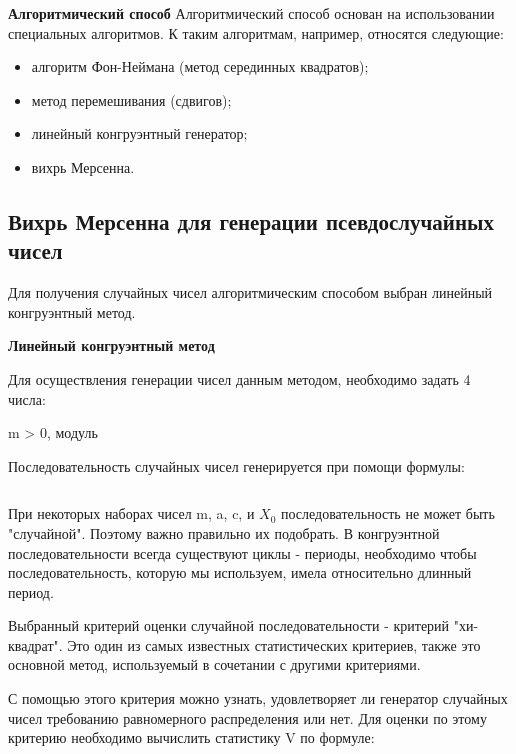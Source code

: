 \documentclass[14pt, a4paper]{extarticle}
\begin{document}
\textbf{Алгоритмический способ}
Алгоритмический способ основан на использовании специальных алгоритмов. К таким алгоритмам, например, относятся следующие:

\begin{itemize}
	\item алгоритм Фон-Неймана (метод серединных квадратов);
	\item метод перемешивания (сдвигов);
	\item линейный конгруэнтный генератор;
	\item вихрь Мерсенна.
\end{itemize}


\subsection{Вихрь Мерсенна для генерации псевдослучайных чисел}

\textbf{}

Для получения случайных чисел алгоритмическим способом выбран линейный конгруэнтный метод.

\textbf{Линейный конгруэнтный метод}

Для осуществления генерации чисел данным методом, необходимо задать 4 числа:


m > 0,  модуль





Последовательность случайных чисел генерируется при помощи формулы:

\begin{equation}
\end{equation}

При некоторых наборах чисел m, a, c, и $X_{0}$ последовательность не может быть "случайной". Поэтому важно правильно их подобрать. В конгруэнтной последовательности всегда существуют циклы - периоды, необходимо чтобы последовательность, которую мы используем, имела относительно длинный период.

Выбранный критерий оценки случайной последовательности - критерий "хи-квадрат". Это один из самых известных статистических критериев, также это основной метод, используемый в сочетании с другими критериями. 

С помощью этого критерия можно узнать, удовлетворяет ли генератор случайных чисел требованию равномерного распределения или нет. 
Для оценки по этому критерию необходимо вычислить статистику V по формуле:
\end{document}
